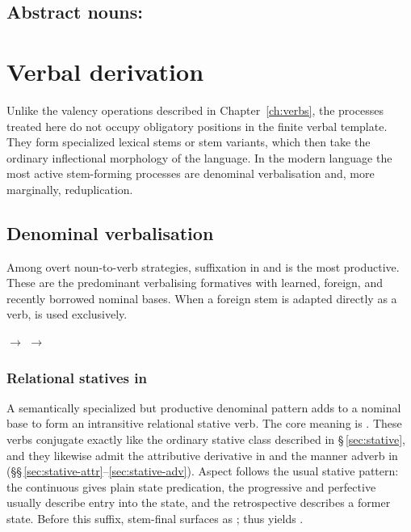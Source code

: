 \subsection{Abstract nouns: }


\section{Verbal derivation}

Unlike the valency operations described in Chapter~\ref{ch:verbs}, the
processes treated here do not occupy obligatory positions in the finite verbal
template. They form specialized lexical stems or stem variants, which then
take the ordinary inflectional morphology of the language. In the modern
language the most active stem-forming processes are denominal
verbalisation and, more marginally, reduplication.

\subsection{Denominal verbalisation}

Among overt noun-to-verb strategies, suffixation in  and
 is the most productive. These are the predominant verbalising
formatives with learned, foreign, and recently borrowed nominal bases.
When a foreign stem is adapted directly as a verb,  is used
exclusively.

\pex
\a {} $\rightarrow$  
\a {} $\rightarrow$  
\xe

\subsubsection{Relational statives in }

A semantically specialized but productive denominal pattern adds
 to a nominal base to form an intransitive relational stative
verb. The core meaning is . These verbs
conjugate exactly like the ordinary stative class described in
§\,\ref{sec:stative}, and they likewise admit the attributive derivative in
 and the manner adverb in 
(§§\,\ref{sec:stative-attr}--\ref{sec:stative-adv}). Aspect follows the
usual stative pattern: the continuous gives plain state predication, the
progressive and perfective usually describe entry into the state, and the
retrospective describes a former state. Before this suffix, stem-final
 surfaces as ; thus  yields .

